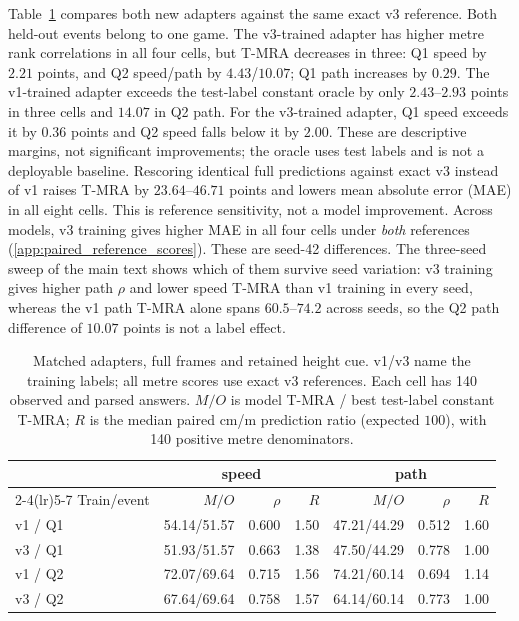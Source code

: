 \documentclass[11pt]{article}
\begin{document}
Table~\ref{tab:matched_label_main} compares both new adapters against the
same exact v3 reference. Both held-out events belong to one game. The
v3-trained adapter has higher metre rank correlations in all four cells,
but T-MRA decreases in three: Q1 speed by $2.21$ points, and Q2
speed/path by $4.43$/$10.07$; Q1 path increases by $0.29$.
The v1-trained adapter exceeds the test-label constant oracle by only
$2.43$--$2.93$ points in three cells and $14.07$ in Q2 path. For the
v3-trained adapter, Q1 speed exceeds it by $0.36$ points and Q2 speed
falls below it by $2.00$. These are descriptive margins, not significant
improvements; the oracle uses test labels and is not a deployable baseline.
Rescoring identical full predictions against exact v3 instead of v1 raises
T-MRA by $23.64$--$46.71$ points and lowers mean absolute error (MAE) in
all eight cells. This is reference sensitivity, not a model improvement.
Across models, v3 training gives higher MAE in all four cells under
\emph{both} references (\ref{app:paired_reference_scores}).
These are seed-42 differences. The three-seed sweep of the main text shows which
of them survive seed variation: v3 training gives higher path $\rho$ and lower
speed T-MRA than v1 training in every seed, whereas the v1 path T-MRA alone spans
$60.5$--$74.2$ across seeds, so the Q2 path difference of $10.07$ points is not a
label effect.

\begin{table}[t]
\centering\footnotesize
\setlength{\tabcolsep}{3pt}
\caption{Matched adapters, full frames and retained height cue. v1/v3 name
the training labels; all metre scores use exact v3 references. Each cell has
140 observed and parsed answers. $M/O$ is model T-MRA / best test-label
constant T-MRA; $R$ is the median paired cm/m prediction ratio (expected
$100$), with 140 positive metre denominators.}
\label{tab:matched_label_main}
\begin{tabular}{lrrrrrr}
\toprule
 & \multicolumn{3}{c}{speed} & \multicolumn{3}{c}{path} \\
\cmidrule(lr){2-4}\cmidrule(lr){5-7}
Train/event & $M/O$ & $\rho$ & $R$ & $M/O$ & $\rho$ & $R$ \\
\midrule
v1 / Q1 & 54.14/51.57 & 0.600 & 1.50 & 47.21/44.29 & 0.512 & 1.60 \\
v3 / Q1 & 51.93/51.57 & 0.663 & 1.38 & 47.50/44.29 & 0.778 & 1.00 \\
v1 / Q2 & 72.07/69.64 & 0.715 & 1.56 & 74.21/60.14 & 0.694 & 1.14 \\
v3 / Q2 & 67.64/69.64 & 0.758 & 1.57 & 64.14/60.14 & 0.773 & 1.00 \\
\bottomrule
\end{tabular}
\end{table}
\end{document}
